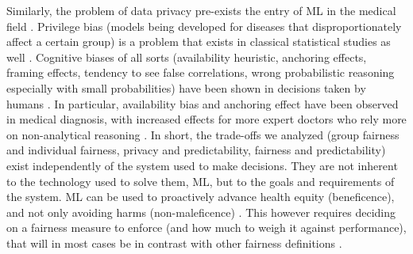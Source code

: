     Similarly, the problem of data privacy pre-exists the entry of ML in the medical field \cite{Dijkstra2020}.
    Privilege bias (models being developed for diseases that disproportionately affect a certain group) \cite{Rajkomar2018} is a problem that exists in classical statistical studies as well \cite{Jackson2019}.
    Cognitive biases of all sorts (availability heuristic, anchoring effects, framing effects, tendency to see false correlations, wrong probabilistic reasoning especially with small probabilities) have been shown in decisions taken by humans \cite{Zerilli2019}.
    In particular, availability bias and anchoring effect have been observed in medical diagnosis, with increased effects for more expert doctors who rely more on non-analytical reasoning \cite{Mamede2010}.
    In short, the trade-offs we analyzed (group fairness and individual fairness, privacy and predictability, fairness and predictability) exist independently of the system used to make decisions.
    They are not inherent to the technology used to solve them, ML, but to the goals and requirements of the system.
    ML can be used to proactively advance health equity (beneficence), and not only avoiding harms (non-maleficence) \cite{Rajkomar2018, Mccradden2020}.
    This however requires deciding on a fairness measure to enforce (and how much to weigh it against performance), that will in most cases be in contrast with other fairness definitions \cite{Zerilli2019}.



